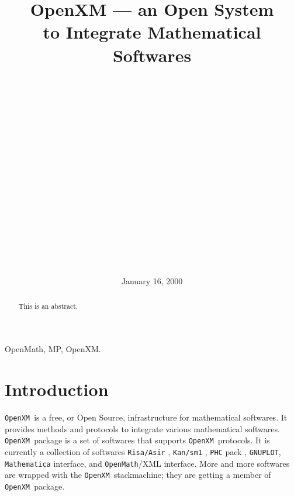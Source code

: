 \documentclass[submit]{acmconf}
\def\OpenXM{{\tt OpenXM\ }}
\begin{document}
\date{January 16, 2000}
\title{OpenXM 
      --- an Open System \\ to Integrate Mathematical Softwares}
\author{\\
         \\
         \\
         \and
         \\
         \\
         \and
         \\
         \\
         \and
         \\
         \\
         \and
         \\
         \\
         \and
         \\
         \\
       }
\maketitle

\begin{abstract}
  This is an abstract.
\end{abstract}

\begin{keywords}
OpenMath, MP, OpenXM. 
\end{keywords}

\section{Introduction}
\OpenXM is a free, or Open Source, infrastructure for mathematical
softwares.
It provides methods and protocols 
to integrate various mathematical softwares.
\OpenXM package is a set of softwares that supports \OpenXM protocols.
It is currently a collection of softwares
{\tt Risa/Asir} \cite{asir}, {\tt Kan/sm1} \cite{kan}, {\tt PHC} pack \cite{phc}, {\tt GNUPLOT},
{\tt Mathematica} interface, and
{\tt OpenMath}/XML \cite{OpenMath}interface. 
More and more softwares are wrapped with the \OpenXM stackmachine;
they are getting a member of \OpenXM package.
\end{document}
